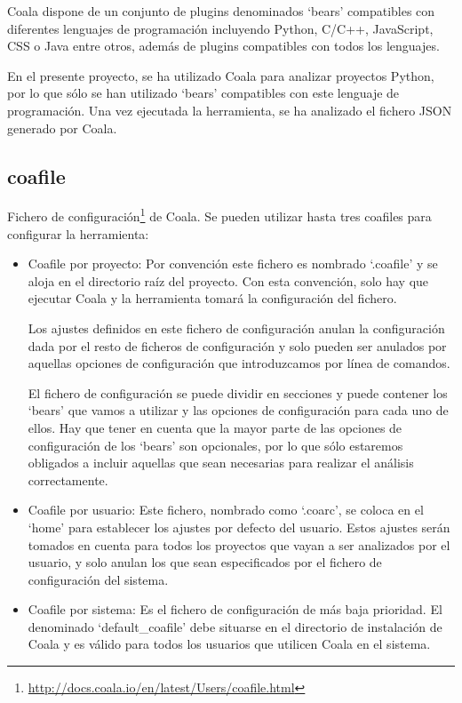 \documentclass[a4paper, 12pt]{book}
\begin{document}
Coala dispone de un conjunto de plugins denominados `bears' compatibles con diferentes lenguajes de programación incluyendo Python, C/C++, JavaScript, CSS o Java entre otros, además de plugins compatibles con todos los lenguajes.

En el presente proyecto, se ha utilizado Coala para analizar proyectos Python, por lo que sólo se han utilizado `bears' compatibles con este lenguaje de programación. Una vez ejecutada la herramienta, se ha analizado el fichero JSON generado por Coala.

\subsection{coafile}
\label{sec:seccion1.1}
Fichero de configuración\footnote{\url{http://docs.coala.io/en/latest/Users/coafile.html}} de Coala. Se pueden utilizar hasta tres coafiles para configurar la herramienta:

\begin{itemize}
  \item Coafile por proyecto: Por convención este fichero es nombrado `.coafile' y se aloja en el directorio raíz del proyecto. Con esta convención, solo hay que ejecutar Coala y la herramienta tomará la configuración del fichero.

Los ajustes definidos en este fichero de configuración anulan la configuración dada por el resto de ficheros de configuración y solo pueden ser anulados por aquellas opciones de configuración que introduzcamos por línea de comandos.

El fichero de configuración se puede dividir en secciones y puede contener los `bears' que vamos a utilizar y las opciones de configuración para cada uno de ellos. Hay que tener en cuenta que la mayor parte de las opciones de configuración de los `bears' son opcionales, por lo que sólo estaremos obligados a incluir aquellas que sean necesarias para realizar el análisis correctamente.
  \item Coafile por usuario: Este fichero, nombrado como `.coarc', se coloca en el `home' para establecer los ajustes por defecto del usuario. Estos ajustes serán tomados en cuenta para todos los proyectos que vayan a ser analizados por el usuario, y solo anulan los que sean especificados por el fichero de configuración del sistema.
  \item Coafile por sistema: Es el fichero de configuración de más baja prioridad. El denominado `default\_coafile' debe situarse en el directorio de instalación de Coala y es válido para todos los usuarios que utilicen Coala en el sistema.
\end{itemize}
\end{document}
